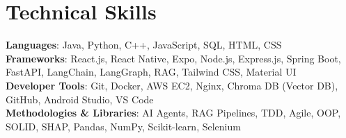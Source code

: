 \documentclass[letterpaper,11pt]{article}
\begin{document}
\section{Technical Skills}
 \begin{itemize}[leftmargin=0.15in, label={}]
    \small{\item{
     \textbf{Languages}{: Java, Python, C++, JavaScript, SQL, HTML, CSS} \\
     \textbf{Frameworks}{: React.js, React Native, Expo, Node.js, Express.js, Spring Boot, FastAPI, LangChain, LangGraph, RAG, Tailwind CSS, Material UI} \\
     \textbf{Developer Tools}{: Git, Docker, AWS EC2, Nginx, Chroma DB (Vector DB), GitHub, Android Studio, VS Code} \\
     \textbf{Methodologies \& Libraries}{: AI Agents, RAG Pipelines, TDD, Agile, OOP, SOLID, SHAP, Pandas, NumPy, Scikit-learn, Selenium}
    }}
 \end{itemize}
\end{document}
